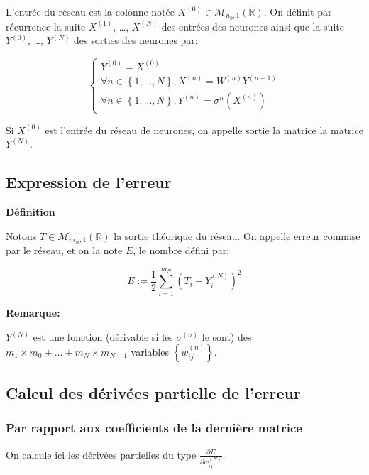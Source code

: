 \documentclass[11pt]{article}
\begin{document}
L'entrée du réseau est la colonne notée
$X^{(0)}\in\mathcal{M}_{n_{0},1}(\mathbb{R})$. On définit par récurrence la
suite $X^{(1)}$, \ldots{}, $X^{(N)}$ des entrées des neurones ainsi que la suite
$Y^{(0)}$, \ldots{}, $Y^{(N)}$ des sorties des neurones par:

\begin{equation}
\begin{cases}
Y^{(0)}=X^{(0)}\\
\forall n\in \left\{1,...,N\right\}, X^{(n)}=W^{(n)}Y^{(n-1)}\\
\forall n\in \left\{1,...,N\right\}, Y^{(n)}=\sigma^{n}(X^{(n)})
\end{cases}
\end{equation}

Si $X^{(0)}$ est l'entrée du réseau de neurones, on appelle sortie la matrice la
matrice $Y^{(N)}$.

\subsection{Expression de l'erreur}
\label{sec-2-2}

\textbf{Définition}

Notons $T\in\mathcal{M}_{m_{N},1}(\mathbb{R})$ la sortie théorique du réseau. On
appelle erreur commise par le réseau, et on la note $E$, le nombre défini par:

\begin{equation}
E:=\frac{1}{2}\sum_{i=1}^{m_{N}}(T_{i}-Y_{i}^{(N)})^{2}
\end{equation}

\textbf{Remarque:}

$Y^{(N)}$ est une fonction (dérivable si les $\sigma^{(n)}$ le sont) des
$m_{1}\times m_{0}+\dots+m_{N}\times m_{N-1}$ variables
$\left\{w_{ij}^{(n)}\right\}$.

\subsection{Calcul des dérivées partielle de l'erreur}
\label{sec-2-3}

\subsubsection{Par rapport aux coefficients de la dernière matrice}
\label{sec-2-3-1}

On calcule ici les dérivées partielles du type
$\frac{\partial E}{\partial w_{ij}^{(N)}}$.
\end{document}
